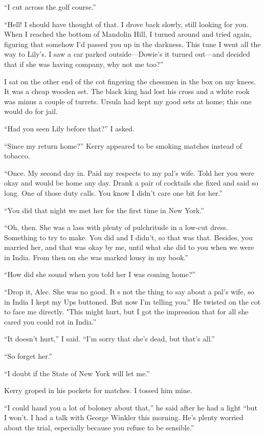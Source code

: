 \documentclass{novel}
\begin{document}
“I cut across the golf course.”

“Hell! I should have thought of that. I drove back slowly, still looking for you. When I reached the bottom of Mandolin Hill, I turned around and tried again, figuring that somehow I’d passed you up in the darkness. This tune I went all the way to Lily’s. I saw a car parked outside—Dowie’s it turned out—and decided that if she was having company, why not me too?”

\scenestars

I sat on the other end of the cot fingering the chessmen in the box on my knees. It was a cheap wooden set. The black king had lost his cross and a white rook was minus a couple of turrets. Ursula had kept my good sets at home; this one would do for jail.

“Had you seen Lily before that?” I asked.

“Since my return home?” Kerry appeared to be smoking matches instead of tobacco. 

“Once. My second day in. Paid my respects to my pal’s wife. Told her you were okay and would be home any day. Drank a pair of cocktails she fixed and said so long. One of those duty calls. You know I didn’t care one bit for her.”

“You did that night we met her for the first time in New York.”

“Oh, then. She was a lass with plenty of pulchritude in a low-cut dress. Something to try to make. You did and I didn’t, so that was that. Besides, you married her, and that was okay by me, until what she did to you when we were in India. From then on she was marked lousy in my book.”

“How did she sound when you told her I was coming home?”

“Drop it, Alec. She was no good. It s not the thing to say about a pal’s wife, so in India I kept my Ups buttoned. But now I’m telling you.” He twisted on the cot to face me directly. "This might hurt, but I got the impression that for all she cared you could rot in India.”

“It doesn’t hurt,” I said. “I’m sorry that she’s dead, but that’s all.”

“So forget her.”

“I doubt if the State of New York will let me.”

Kerry groped in his pockets for matches. I tossed him mine.

“I could hand you a lot of boloney about that,” he said after he had a light “but I won’t. I had a talk with George Winkler this morning. He’s plenty worried about the trial, especially because you refuse to be sensible.”
\end{document}
